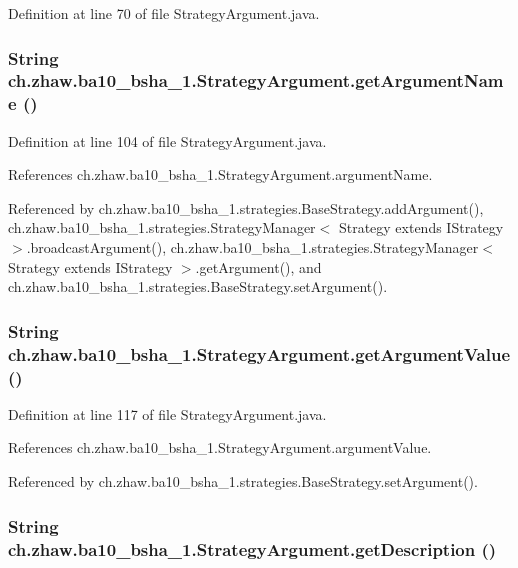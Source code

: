 Definition at line 70 of file StrategyArgument.java.\hypertarget{classch_1_1zhaw_1_1ba10__bsha__1_1_1StrategyArgument_a21d958fbf972ae5087f67783e0e39f1c}{
\subsubsection[{getArgumentName}]{\setlength{\rightskip}{0pt plus 5cm}String ch.zhaw.ba10\_\-bsha\_\-1.StrategyArgument.getArgumentName ()}}
\label{classch_1_1zhaw_1_1ba10__bsha__1_1_1StrategyArgument_a21d958fbf972ae5087f67783e0e39f1c}


Definition at line 104 of file StrategyArgument.java.

References ch.zhaw.ba10\_\-bsha\_\-1.StrategyArgument.argumentName.

Referenced by ch.zhaw.ba10\_\-bsha\_\-1.strategies.BaseStrategy.addArgument(), ch.zhaw.ba10\_\-bsha\_\-1.strategies.StrategyManager$<$ Strategy extends IStrategy $>$.broadcastArgument(), ch.zhaw.ba10\_\-bsha\_\-1.strategies.StrategyManager$<$ Strategy extends IStrategy $>$.getArgument(), and ch.zhaw.ba10\_\-bsha\_\-1.strategies.BaseStrategy.setArgument().\hypertarget{classch_1_1zhaw_1_1ba10__bsha__1_1_1StrategyArgument_a76a205f94be443d1afa031656caeea23}{
\subsubsection[{getArgumentValue}]{\setlength{\rightskip}{0pt plus 5cm}String ch.zhaw.ba10\_\-bsha\_\-1.StrategyArgument.getArgumentValue ()}}
\label{classch_1_1zhaw_1_1ba10__bsha__1_1_1StrategyArgument_a76a205f94be443d1afa031656caeea23}


Definition at line 117 of file StrategyArgument.java.

References ch.zhaw.ba10\_\-bsha\_\-1.StrategyArgument.argumentValue.

Referenced by ch.zhaw.ba10\_\-bsha\_\-1.strategies.BaseStrategy.setArgument().\hypertarget{classch_1_1zhaw_1_1ba10__bsha__1_1_1StrategyArgument_a4006c3123680c0506a6988ac46037c12}{
\subsubsection[{getDescription}]{\setlength{\rightskip}{0pt plus 5cm}String ch.zhaw.ba10\_\-bsha\_\-1.StrategyArgument.getDescription ()}}
\label{classch_1_1zhaw_1_1ba10__bsha__1_1_1StrategyArgument_a4006c3123680c0506a6988ac46037c12}


